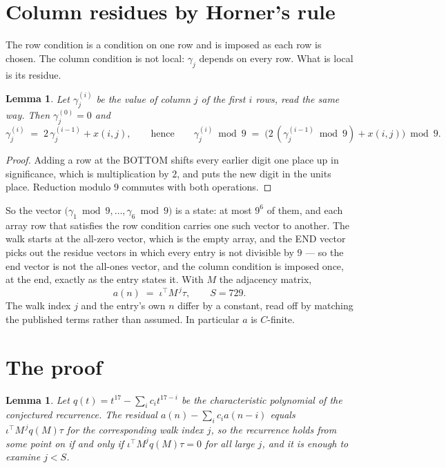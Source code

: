 \documentclass[11pt,a4paper]{article}
\theoremstyle{plain}
\newtheorem{lemma}[theorem]{Lemma}
\theoremstyle{definition}
\begin{document}
\section{Column residues by Horner's rule}

The row condition is a condition on one row and is imposed as each row is chosen. The column
condition is not local: $\gamma_j$ depends on every row. What is local is its residue.

\begin{lemma}\label{lem:horner}
Let $\gamma_j^{(i)}$ be the value of column $j$ of the first $i$ rows, read the same way.
Then $\gamma_j^{(0)}=0$ and
\[
\gamma_j^{(i)}\;=\;2\,\gamma_j^{(i-1)}+x(i,j),
\qquad\text{hence}\qquad
\gamma_j^{(i)}\bmod 9\;=\;
\bigl(2\,(\gamma_j^{(i-1)}\bmod 9)+x(i,j)\bigr)\bmod 9 .
\]
\end{lemma}

\begin{proof}
Adding a row at the BOTTOM shifts every earlier digit one place up in significance, which is
multiplication by $2$, and puts the new digit in the units place. Reduction modulo
$9$ commutes with both operations.
\end{proof}

So the vector $\bigl(\gamma_1\bmod 9,\dots,\gamma_{6}\bmod
9\bigr)$ is a state: at most $9^{6}$ of them, and each array row
that satisfies the row condition carries one such vector to another. The walk starts at the
all-zero vector, which is the empty array, and the END vector picks out the residue vectors in
which every entry is not divisible by $9$ --- so the end vector is not the all-ones
vector, and the column condition is imposed once, at the end, exactly as the entry states it.
With $M$ the adjacency matrix,
\[
a(n)\;=\;\iota^{\!\top}M^{\,j}\tau ,\qquad S=729.
\]
The walk index $j$ and the entry's own $n$ differ by a constant, read off by matching the
published terms rather than assumed. In particular $a$ is $C$-finite.

\section{The proof}

\begin{lemma}\label{lem:crit}
Let $q(t)=t^{17}-\sum_i c_it^{17-i}$ be the characteristic polynomial of the
conjectured recurrence. The residual $a(n)-\sum_ic_ia(n-i)$ equals
$\iota^{\!\top}M^{\,j}q(M)\tau$ for the corresponding walk index $j$, so the recurrence
holds from some point on if and only if $\iota^{\!\top}M^{j}q(M)\tau=0$ for all large $j$,
and it is enough to examine $j<S$.
\end{lemma}
\end{document}
